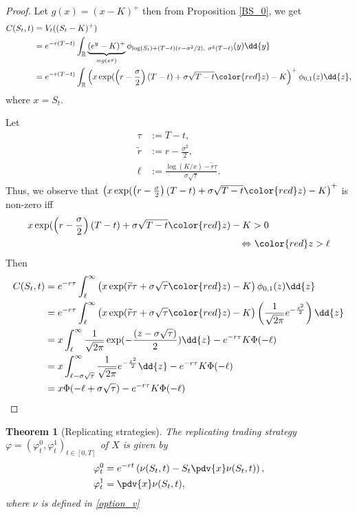 \documentclass[10pt]{article}
\theoremstyle{remark}
\theoremstyle{plain}
\newtheorem{Theorem}{Theorem}[section]
\newcommand{\R}{\mathbb{R}}
\numberwithin{equation}{section}
\renewcommand{\tilde}{\widetilde}
\begin{document}
\begin{proof}
	Let $g(x) = (x-K)^+$ then from Proposition \ref{BS_0}, we get
	\begin{align*}
	C(S_t,t) & = V_t((S_t-K)^+) \\
	& = e^{-r(T-t)} \int_\R \underbrace{(e^y-K)^+}_{=g(e^y)}  \phi_{\log(S_t)+ (T-t)(r-\sigma^2/2),\ \sigma^2(T-t)} (y) \dd{y}
	\\
	& = e^{-r(T-t)} \int_\R \left(x \exp(\left(r-\frac{\sigma}{2}\right)(T-t) + \sigma\sqrt{T-t}{\color{red}z}) - K\right)^+ \phi_{0,1}(z) \dd{z},
	\end{align*}
	where $x = S_t$.
	
	Let
	\begin{align*}
		\tau & := T-t,\\
		\tilde{r} &:= r-\frac{\sigma^2}{2},\\
		\ell &:= \frac{\log(K/x) - \tilde{r}\tau}{\sigma \sqrt{\tau}}.
	\end{align*}
	Thus, we observe that $\left(x \exp(\left(r-\frac{\sigma}{2}\right)(T-t) + \sigma\sqrt{T-t}{\color{red}z}) - K\right)^+$ is non-zero iff
	\begin{align*}
		x \exp(\left(r-\frac{\sigma}{2}\right)(T-t) + \sigma\sqrt{T-t}{\color{red}z}) - K  & > 0 \\
		\Leftrightarrow &\ {\color{red}z} > \ell
	\end{align*}
	Then
	\begin{align*}
		C(S_t,t) & = e^{-r\tau} \int_\ell^\infty \left(x \exp(\tilde{r}\tau + \sigma\sqrt{\tau}{\color{red}z}) - K\right) \phi_{0,1}(z) \dd{z} 
		\\
		& = e^{-r\tau} \int_\ell^\infty \left(x \exp(\tilde{r}\tau + \sigma\sqrt{\tau}{\color{red}z}) - K\right) \left(\frac{1}{\sqrt{2\pi}} e^{-\frac{z^2}{2}}\right) \dd{z} 
		\\
		& = x \int_\ell^\infty \frac{1}{\sqrt{2\pi}} \exp(-\frac{(z-\sigma\sqrt{\tau})}{2}) \dd{z} - e^{-r\tau} K \Phi(-\ell)
		\\
		& = x \int^\infty_{\ell - \sigma\sqrt{\tau}} \frac{1}{\sqrt{2\pi}} e^{-\frac{z^2}{2}} \dd{z}- e^{-r\tau} K \Phi(-\ell)
		\\
		& = x \Phi(-\ell + \sigma\sqrt{\tau}) - e^{-r\tau} K \Phi(-\ell)
	\end{align*}
\end{proof}

\begin{Theorem}[Replicating strategies]
	The replicating trading strategy $\varphi = (\varphi^0_t, \varphi^1_t)_{t\in[0,T]}$ of $X$ is given by 
	\begin{equation}
		\begin{aligned}
			\varphi^0_t &= e^{-rt} \left(\nu(S_t,t) - S_t \pdv{x}\nu(S_t,t) \right),\\
			\varphi^1_t &= \pdv{x} \nu(S_t,t),
		\end{aligned}
	\end{equation}
	where $\nu$ is defined in \eqref{option_v}
\end{Theorem}
\end{document}
